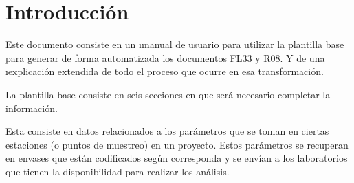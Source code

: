 
\chapter{Introducción}

Este documento consiste en un \i{manual de usuario} para utilizar la plantilla base para generar de forma automatizada los documentos FL33 y R08. Y de una \i{explicación extendida} de todo el proceso que ocurre en esa transformación.

La plantilla base consiste en seis secciones en que será necesario completar la información.

Esta consiste en datos relacionados a los parámetros que se toman en ciertas estaciones (o puntos de muestreo) en un proyecto. Estos parámetros se recuperan en envases que están codificados según corresponda y se envían a los laboratorios que tienen la disponibilidad para realizar los análisis.

